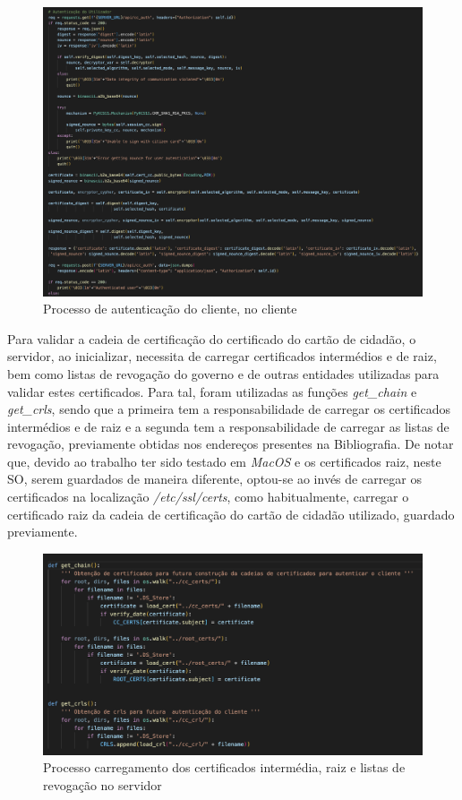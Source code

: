 \documentclass[10pt,english]{article}
\begin{document}
\begin{figure}[!h]
        \centering
        \includegraphics[width=\textwidth]{images/cc_auth_client.png}
        \caption{Processo de autenticação do cliente, no cliente}
\end{figure}

\clearpage

\par Para validar a cadeia de certificação do certificado do cartão de cidadão, o servidor, ao inicializar, necessita de carregar certificados intermédios e de raiz, bem como listas de revogação do governo e de outras entidades utilizadas para validar estes certificados. Para tal, foram utilizadas as funções \textit{get\_chain} e \textit{get\_crls}, sendo que a primeira tem a responsabilidade de carregar os certificados intermédios e de raiz e a segunda tem a responsabilidade de carregar as listas de revogação, previamente obtidas nos endereços presentes na Bibliografia. De notar que, devido ao trabalho ter sido testado em \textit{MacOS} e os certificados raiz, neste SO, serem guardados de maneira diferente, optou-se ao invés de carregar os certificados na localização \textit{/etc/ssl/certs}, como habitualmente, carregar o certificado raiz da cadeia de certificação do cartão de cidadão utilizado, guardado previamente.

\begin{figure}[!h]
        \centering
        \includegraphics[width=\textwidth]{images/get_chain_get_crl.png}
        \caption{Processo carregamento dos certificados intermédia, raiz e listas de revogação no servidor}
\end{figure}
\end{document}
